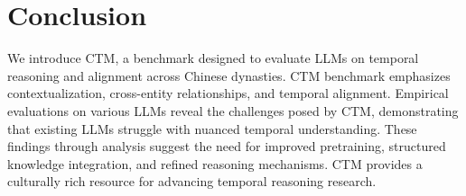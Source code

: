 \section{Conclusion}
We introduce CTM, a benchmark designed to
evaluate LLMs on temporal reasoning and alignment across Chinese dynasties.
CTM benchmark emphasizes contextualization, cross-entity relationships, and temporal alignment.
Empirical evaluations on various LLMs reveal the challenges posed by CTM, demonstrating that existing LLMs struggle with nuanced temporal understanding. 
These findings through analysis suggest the need for improved pretraining, structured knowledge integration, and refined reasoning mechanisms.
CTM provides a culturally rich resource for advancing temporal reasoning research. 
